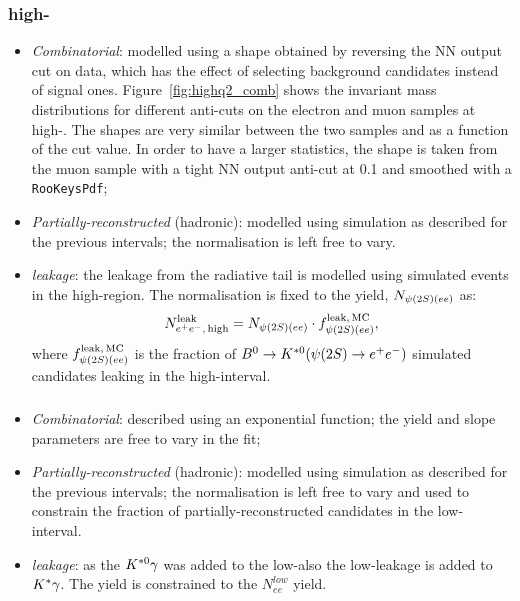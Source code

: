 \subsubsection*{\BdToKstee high-\qsq}
%
\begin{itemize}

\item \textit{Combinatorial}: modelled using a shape obtained by reversing the NN output cut on data,
which has the effect of selecting background candidates instead of signal ones.
Figure~\ref{fig:highq2_comb} shows the invariant mass distributions for different anti-cuts on the electron 
and muon samples at high-\qsq. The shapes are very similar between the two samples and as a function 
of the cut value. In order to have a larger statistics, the shape is taken from the muon sample with a tight
NN output anti-cut at 0.1 and smoothed with a \texttt{RooKeysPdf};

\item \textit{Partially-reconstructed} (hadronic): modelled using simulation as described for the previous intervals;
 the normalisation is left free to vary.

\item \textit{\BdToKstPsi leakage}: the leakage from the \psitwos radiative tail is modelled using simulated 
\BdToKstPsiee events in the high-\qsq region. The normalisation is fixed to 
the \BdToKstPsiee yield, $N_{\psitwos(ee)}$ as:
%
$$N_{\ee, \, {\rm high}}^{\rm leak} = N_{\psitwos(ee)} \cdot f_{\psitwos(ee)}^{\rm leak, \,MC},$$
%
where $f_{\psitwos(ee)}^{\rm leak, \,MC}$ is the fraction of $\Bd\to\Kstarz(\psitwos\to\ee)$ simulated candidates
leaking in the high-\qsq interval.

\end{itemize}

\subsubsection*{\BdToKstG}

\begin{itemize}

\item \textit{Combinatorial}: described using an exponential function; the yield and slope parameters are free to vary in the fit;

\item \textit{Partially-reconstructed} (hadronic): modelled using simulation as described for the previous intervals;
 the normalisation is left free to vary and used to constrain the fraction of partially-reconstructed candidates in the low-\qsq interval.

\item \textit{\BdToKstee leakage}: as the ${{K}^{*0}}\gamma$ was added to the low-\qsq also the low-\qsq leakage is added
to ${{K}^*}\gamma$. The yield is constrained to the $N_{ee}^{low}$ yield.

\end{itemize}


